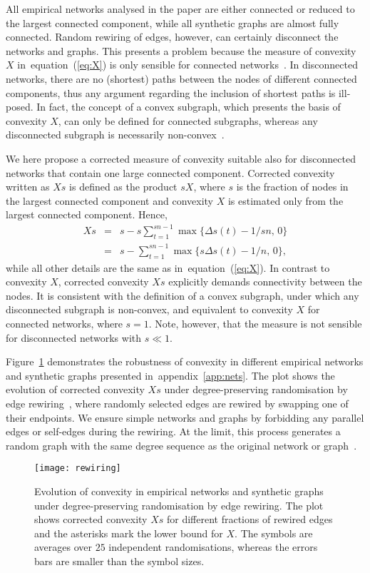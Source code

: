 \documentclass[]{rsif}
\newcommand{\set}[1]{\{#1\}}
\newcommand{\Figref}[1]{Figure~\ref{fig:#1}\xspace}
\renewcommand{\eqref}[1]{equation~(\ref{eq:#1})\xspace}
\newcommand{\appref}[1]{appendix~\ref{app:#1}\xspace}
\begin{document}
All empirical networks analysed in the paper are either connected or reduced to the largest connected component, while all synthetic graphs are almost fully connected. Random rewiring of edges, however, can certainly disconnect the networks and graphs. This presents a problem because the measure of convexity $X$ in~\eqref{X} is only sensible for connected networks~\cite{MS18}. In disconnected networks, there are no (shortest) paths between the nodes of different connected components, thus any argument regarding the inclusion of shortest paths is ill-posed. In fact, the concept of a convex subgraph, which presents the basis of convexity $X$, can only be defined for connected subgraphs, whereas any disconnected subgraph is necessarily non-convex~\cite{HN81,FJ86}.

We here propose a corrected measure of convexity suitable also for disconnected networks that contain one large connected component. Corrected convexity written as $Xs$ is defined as the product $sX$, where $s$ is the fraction of nodes in the largest connected component and convexity $X$ is estimated only from the largest connected component. Hence,
\begin{eqnarray}
	Xs & = & s-s\sum_{t=1}^{sn-1}\max\set{\Delta s(t)-1/sn,\,0} \nonumber\\
	& = & s-\sum_{t=1}^{sn-1}\max\set{s\Delta s(t)-1/n,\,0}, \label{eq:Xs}
\end{eqnarray}
while all other details are the same as in~\eqref{X}. In contrast to convexity $X$, corrected convexity $Xs$ explicitly demands connectivity between the nodes. It is consistent with the definition of a convex subgraph, under which any disconnected subgraph is non-convex, and equivalent to convexity $X$ for connected networks, where $s=1$. Note, however, that the measure is not sensible for disconnected networks with $s\ll 1$.

\Figref{rewiring} demonstrates the robustness of convexity in different empirical networks and synthetic graphs presented in~\appref{nets}. The plot shows the evolution of corrected convexity $Xs$ under degree-preserving randomisation by edge rewiring~\cite{MS02}, where randomly selected edges are rewired by swapping one of their endpoints. We ensure simple networks and graphs by forbidding any parallel edges or self-edges during the rewiring. At the limit, this process generates a random graph with the same degree sequence as the original network or graph~\cite{NSW01}.

\begin{figure}[t]
	\centering\texttt{[image: rewiring]}%
	\caption{\label{fig:rewiring}Evolution of convexity in empirical networks and synthetic graphs under degree-preserving randomisation by edge rewiring. The plot shows corrected convexity $Xs$ for different fractions of rewired edges and the asterisks mark the lower bound for $X$. The symbols are averages over $25$ independent randomisations, whereas the errors bars are smaller than the symbol sizes.} 
\end{figure}
\end{document}
